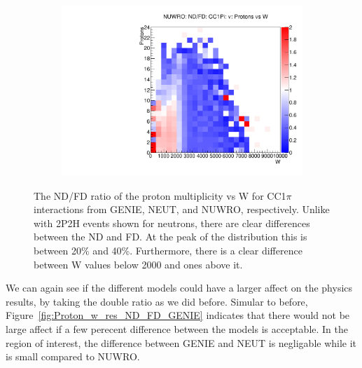 \documentclass[12pt]{article}
\begin{document}
\begin{figure}
\begin{subfigure}[b]{0.32\textwidth}
\end{subfigure}
\begin{subfigure}[b]{0.32\textwidth}
  \includegraphics[width=\textwidth]{nprotons_w/Nprotons_W_nuc_rest_res_NUWRO_ND_FD_numu_norm.pdf}
\end{subfigure}
\caption{The ND/FD ratio of the proton multiplicity vs W for CC1$\pi$ interactions from GENIE, NEUT, and NUWRO, respectively.  Unlike with 2P2H events shown for neutrons, there are clear differences between the ND and FD.  At the peak of the distribution this is between 20\% and 40\%.  Furthermore, there is a clear difference between W values below 2000 and ones above it.}
\label{fig:Proton_w_res_ND_FD}
\end{figure}

We can again see if the different models could have a larger affect on the physics results, by taking the double ratio as we did before.
Simular to before, Figure~\ref{fig:Proton_w_res_ND_FD_GENIE} indicates that there would not be large affect if a few perecent difference between the models is acceptable.
In the region of interest, the difference between GENIE and NEUT is negligable while it is small compared to NUWRO.
\end{document}
